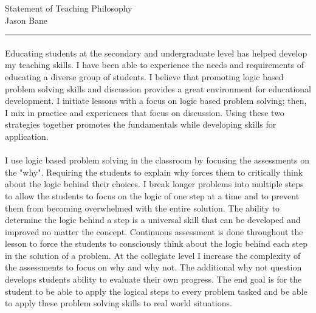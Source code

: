 \documentclass[12pt,letterpaper]{article}
\begin{document}
\begin{center}	{\huge  Statement of Teaching Philosophy}\\
{\large Jason Bane}
\end{center}
\hrule


\paragraph{}Educating students at the secondary and undergraduate level has helped develop my teaching skills. I have been able to experience the needs and requirements of educating a diverse group of students. I believe that promoting logic based problem solving skills and discussion provides a great environment for educational development. I initiate lessons with a focus on logic based problem solving; then, I mix in practice and experiences that focus on discussion. Using these two strategies together promotes the fundamentals while developing skills for application. 
\paragraph{}I use logic based problem solving in the classroom by focusing the assessments on the "why". Requiring the students to explain why forces them to critically think about the logic behind their choices. I break longer problems into multiple steps to allow the students to focus on the logic of one step at a time and to prevent them from becoming overwhelmed with the entire solution. The ability to determine the logic behind a step is a universal skill that can be developed and improved no matter the concept. Continuous assessment is done throughout the lesson to force the students to consciously think about the logic behind each step in the solution of a problem. At the collegiate level I increase the complexity of the assessments to focus on why and why not. The additional why not question develops students ability to evaluate their own progress. The end goal  is for the student to be able to apply the logical steps to every problem tasked and be able to apply these problem solving skills to real world situations. 
\end{document}
